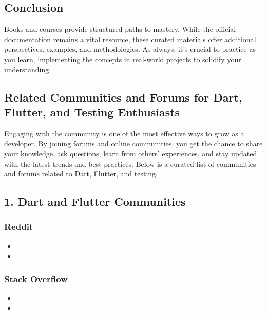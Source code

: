 \subsection*{Conclusion}

Books and courses provide structured paths to mastery. 
While the official documentation remains a vital resource, these curated materials offer additional perspectives, examples, and methodologies. 
As always, it's crucial to practice as you learn, implementing the concepts in real-world projects to solidify your understanding.



\subsection{Related Communities and Forums for Dart, Flutter, and Testing Enthusiasts}

Engaging with the community is one of the most effective ways to grow as a developer. 
By joining forums and online communities, you get the chance to share your knowledge, ask questions, learn from others' experiences, and stay updated with the latest trends and best practices. 
Below is a curated list of communities and forums related to Dart, Flutter, and testing.

\subsection*{1. Dart and Flutter Communities}

\subsubsection*{Reddit}

\begin{itemize}
 \item {}
 \item {}
\end{itemize}

\subsubsection*{Stack Overflow}

\begin{itemize}
 \item {}
 \item {}
\end{itemize}

